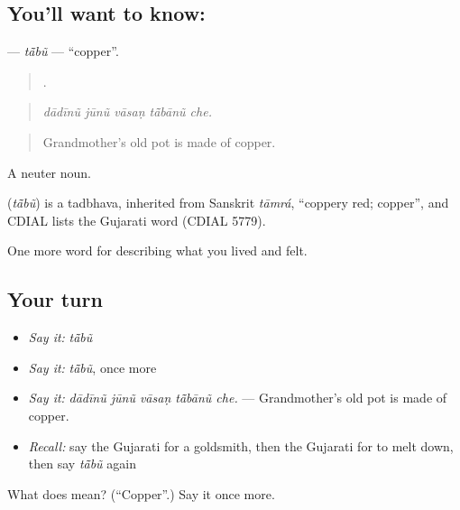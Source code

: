 \subsection*{You'll want to know: }
\textbf{} — \emph{tā̃bũ} — \textquotedblleft{}copper\textquotedblright{}.

\begin{quote}
    .
\end{quote}

\begin{quote}
\emph{dādīnũ jūnũ vāsaṇ tā̃bānũ che.}
\end{quote}

\begin{quote}
Grandmother's old pot is made of copper.
\end{quote}

A neuter noun.

\begin{cousinweb}
\textbf{} (\emph{tā̃bũ}) is a tadbhava, inherited from Sanskrit \emph{tāmrá}, \textquotedblleft{}coppery red; copper\textquotedblright{}, and CDIAL lists the Gujarati word (CDIAL 5779).
\end{cousinweb}

\begin{grammarlens}[title={What you've built}]
One more word for describing what you lived and felt.
\end{grammarlens}

\subsection*{Your turn}
\begin{itemize}
\raggedright
  \item \emph{Say it:} \emph{tā̃bũ}
  \item \emph{Say it:} \emph{tā̃bũ}, once more
  \item \emph{Say it:} \emph{dādīnũ jūnũ vāsaṇ tā̃bānũ che.} — Grandmother's old pot is made of copper.
  \item \emph{Recall:} say the Gujarati for a goldsmith, then the Gujarati for to melt down, then say \emph{tā̃bũ} again
\end{itemize}

\begin{tcolorbox}[breakable,colback=teal!4,colframe=teal!35!black,title={Before you move on}]
What does  mean? (\textquotedblleft{}Copper\textquotedblright{}.) Say it once more.
\end{tcolorbox}
